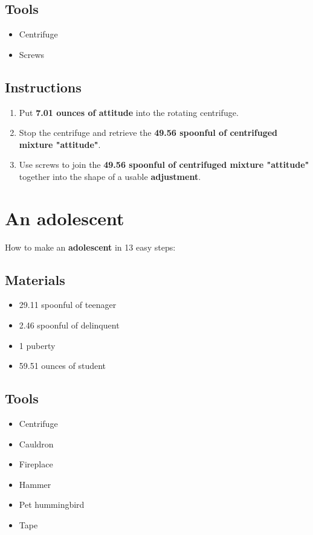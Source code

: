 \documentclass{article}
\begin{document}
\subsection{Tools}\begin{itemize}
\item 
Centrifuge
\item 
Screws
\end{itemize}
\subsection{Instructions}\begin{enumerate}
\item 
Put \textbf{7.01 ounces of attitude} into the rotating centrifuge.
\item 
Stop the centrifuge and retrieve the \textbf{49.56 spoonful of centrifuged mixture "attitude"}.
\item 
Use screws to join the \textbf{49.56 spoonful of centrifuged mixture "attitude"} together into the shape of a usable \textbf{adjustment}.
\end{enumerate}
\newpage
\section{An adolescent}How to make an \textbf{adolescent} in 13 easy steps:

\subsection{Materials}\begin{itemize}
\item 
29.11 spoonful of teenager
\item 
2.46 spoonful of delinquent
\item 
1 puberty
\item 
59.51 ounces of student
\end{itemize}
\subsection{Tools}\begin{itemize}
\item 
Centrifuge
\item 
Cauldron
\item 
Fireplace
\item 
Hammer
\item 
Pet hummingbird
\item 
Tape
\end{itemize}
\end{document}
